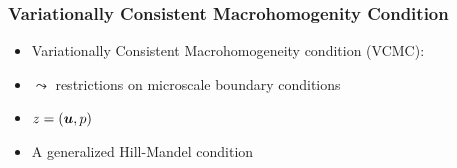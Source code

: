 \documentclass[11pt]{beamer} %
\newcommand{\volume}{|\Omega_\rve|}
\newcommand{\rve}{
  {\mathchoice
   {\mbox{\scalebox{0.67}{$\Box$}}}
   {\mbox{\scalebox{0.67}{$\Box$}}}
   {\mbox{\scalebox{0.5}{$\Box$}}}
   {\mbox{\scalebox{0.375}{$\Box$}}}
  }
}
\begin{document}
\begin{frame}
 \frametitle{Variationally Consistent Macrohomogenity Condition}
\begin{itemize}
 \item Variationally Consistent Macrohomogeneity condition (VCMC):
 \begin{center}
  
 \end{center}
 \item $\leadsto$ restrictions on microscale boundary conditions
 \item $z = (\boldsymbol{u}, p)$
 \item A generalized Hill-Mandel condition
\end{itemize}
\end{frame}



%  
\end{document}
